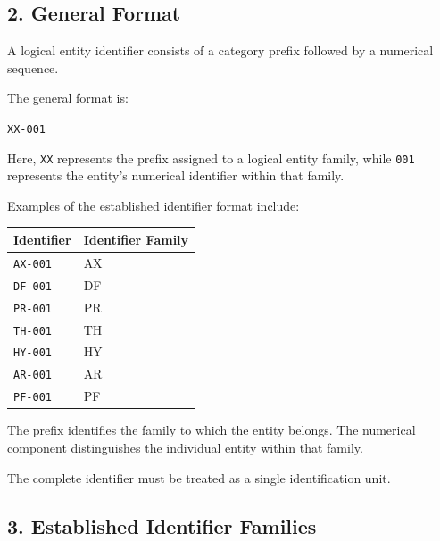 
\subsection*{2. General Format}

A logical entity identifier consists of a
category prefix followed by a numerical sequence.

The general format is:

\begin{center}
    \texttt{XX-001}
\end{center}

Here, \texttt{XX} represents the prefix assigned
to a logical entity family, while \texttt{001}
represents the entity's numerical identifier
within that family.

Examples of the established identifier format
include:

\begin{center}
\begin{tabular}{ll}
    \toprule
    \textbf{Identifier} & \textbf{Identifier Family} \\
    \midrule
    \texttt{AX-001} & AX \\
    \texttt{DF-001} & DF \\
    \texttt{PR-001} & PR \\
    \texttt{TH-001} & TH \\
    \texttt{HY-001} & HY \\
    \texttt{AR-001} & AR \\
    \texttt{PF-001} & PF \\
    \bottomrule
\end{tabular}
\end{center}

The prefix identifies the family to which
the entity belongs. The numerical component
distinguishes the individual entity within
that family.

The complete identifier must be treated
as a single identification unit.


\subsection*{3. Established Identifier Families}

